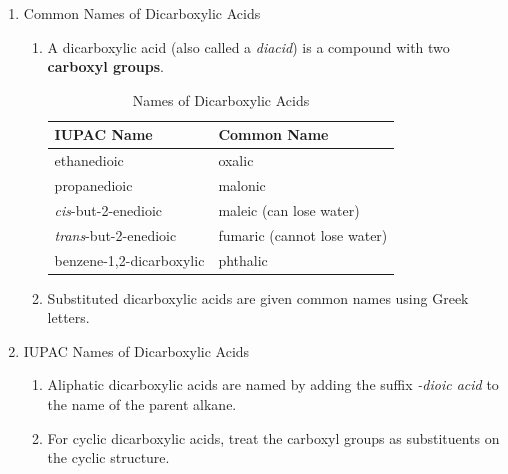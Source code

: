 \begin{enumerate}
    \item Common Names of Dicarboxylic Acids
    \begin{enumerate}
        \item A dicarboxylic acid (also called a \textit{diacid}) is a compound with two \textbf{carboxyl groups}.
        \begin{table}[h]
            \centering
            \begin{tabular}{|l|l|}
            \hline
                IUPAC Name & Common Name \\ \hline
                ethanedioic & oxalic \\
                propanedioic & malonic \\
                \textit{cis}-but-2-enedioic & maleic (can lose water)\\
                \textit{trans}-but-2-enedioic & fumaric (cannot lose water)\\
                benzene-1,2-dicarboxylic & phthalic \\ \hline
            \end{tabular}
            \caption{Names of Dicarboxylic Acids}
            \label{20.2_Dicarboxylic_Acid_Name}
        \end{table}
        \item Substituted dicarboxylic acids are given common names using Greek letters.
    \end{enumerate} 
    \item IUPAC Names of Dicarboxylic Acids
    \begin{enumerate}
        \item Aliphatic dicarboxylic acids are named by adding the suffix \textit{-dioic acid} to the name of the parent alkane.
        \item For cyclic dicarboxylic acids, treat the carboxyl groups as substituents on the cyclic structure.
    \end{enumerate}
\end{enumerate}
\chemnameinit{}
\begin{center}
     \quad
\end{center}
\begin{center}
     \qquad \qquad \qquad \qquad
\end{center}

